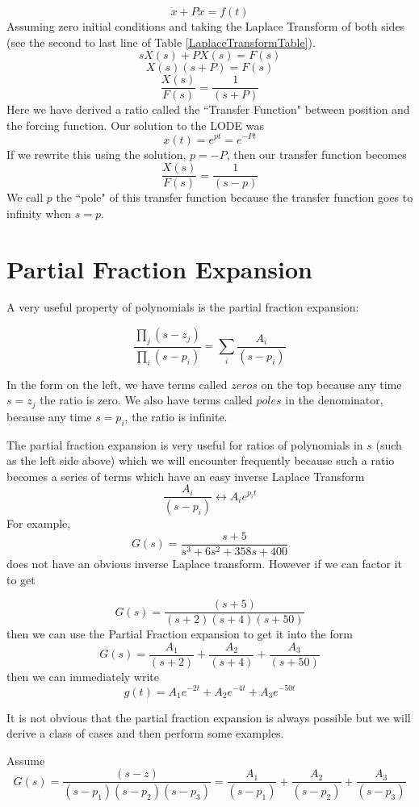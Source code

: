 \[
\dot{x} + Px = f(t)
\]
Assuming zero initial conditions and taking the Laplace Transform of both sides (see the second to last line of Table \ref{LaplaceTransformTable}).
\[
sX(s) + PX(s) = F(s)
\]
\[
X(s) (s+P) = F(s)
\]
\[
\frac{X(s)}{F(s)} = \frac {1}  {(s+P)}
\]
Here we have derived a ratio called the ``Transfer Function" between position and the forcing function.  Our solution to the LODE was
\[
x(t) =  e^{pt} =  e^{-Pt}
\]
If we rewrite this using the solution, $p = -P$, then our transfer function becomes
\[
\frac{X(s)}{F(s)} = \frac {1}  {(s-p)}
\]
We call $p$ the ``pole" of this transfer function because the transfer function goes to infinity when $s=p$.



\section{Partial Fraction Expansion}\label{partialfractionsection}

A very useful property of polynomials is the partial fraction expansion:

\[
\frac{\prod_j (s-z_j)}{\prod_i (s-p_i)}    =  \sum_i  \frac{A_i}{(s-p_i)}
\]

In the form on the left, we have terms called $zeros$ on the top because any time $s=z_j$ the ratio is zero.  We also have terms called $poles$ in the denominator, because any time $s=p_i$, the ratio is infinite.

The partial fraction expansion is very useful for ratios of polynomials in $s$ (such as the left side above) which we will encounter frequently because such a ratio becomes a series of terms which have an easy inverse Laplace Transform
\[
\frac{A_i}{(s-p_i)}   \leftrightarrow  A_ie^{p_it}
\]
For example,
\[
G(s) = \frac{s+5}{s^3 + 6s^2+ 358s+400}
\]
does not have an obvious inverse Laplace transform.   However if we can factor it to get

\[
G(s) = \frac  {(s+5)}   {(s+2)(s+4)(s+50)}
\]
then we can use the Partial Fraction expansion to  get it into the form
\[
G(s) = \frac{A_1}{(s+2)}+\frac{A_2}{(s+4)}+\frac{A_3}{(s+50)}
\]
then we can immediately write
\[
g(t) = A_1e^{-2t} + A_2e^{-4t} + A_3e^{-50t}
\]





It is not obvious that the partial fraction expansion is always possible but we will derive a class of cases and then perform some examples.

Assume
\[
G(s) = \frac  {(s-z)}   {(s-p_1)(s-p_2)(s-p_3)} =  \frac{A_1}{(s-p_1)}+\frac{A_2}{(s-p_2)}+\frac{A_3}{(s-p_3)}
\]

